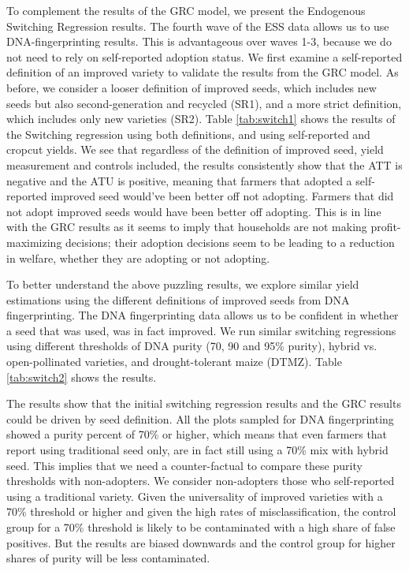 \documentclass[11pt]{article}
\begin{document}
To complement the results of the GRC model, we present the Endogenous Switching Regression results. The fourth wave of the ESS data allows us to use DNA-fingerprinting results. This is advantageous over waves 1-3, because we do not need to rely on self-reported adoption status. We first examine a self-reported definition of an improved variety to validate the results from the GRC model. As before, we consider a looser definition of improved seeds, which includes new seeds but also second-generation and recycled (SR1), and a more strict definition, which includes only new varieties (SR2). Table \ref{tab:switch1} shows the results of the Switching regression using both definitions, and using self-reported and cropcut yields. We see that regardless of the definition of improved seed, yield measurement and controls included, the results consistently show that the ATT is negative and the ATU is positive, meaning that farmers that adopted a self-reported improved seed would've been better off not adopting. Farmers that did not adopt improved seeds would have been better off adopting. This is in line with the GRC results as it seems to imply that households are not making profit-maximizing decisions; their adoption decisions seem to be leading to a reduction in welfare, whether they are adopting or not adopting.



To better understand the above puzzling results, we explore similar yield estimations using the different definitions of improved seeds from DNA fingerprinting. The DNA fingerprinting data allows us to be confident in whether a seed that was used, was in fact improved. We run similar switching regressions using different thresholds of DNA purity (70, 90 and 95\% purity), hybrid vs. open-pollinated varieties, and drought-tolerant maize (DTMZ). Table \ref{tab:switch2} shows the results. 

The results show that the initial switching regression results and the GRC results could be driven by seed definition. All the plots sampled for DNA fingerprinting showed a purity percent of 70\% or higher, which means that even farmers that report using traditional seed only, are in fact still using a 70\% mix with hybrid seed. This implies that we need a counter-factual to compare these purity thresholds with non-adopters. We consider non-adopters those who self-reported using a traditional variety. Given the universality of improved varieties with a 70\% threshold or higher and given the high rates of misclassification, the control group for a 70\% threshold is likely to be contaminated with a high share of false positives. But the results are biased downwards and the control group for higher shares of purity will be less contaminated. 
\end{document}
